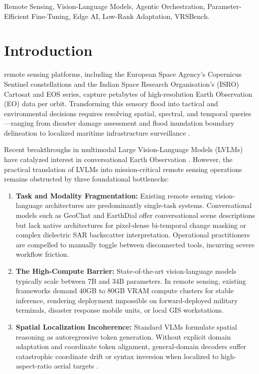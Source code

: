\documentclass[lettersize,journal]{IEEEtran}
\begin{document}
\begin{IEEEkeywords}
Remote Sensing, Vision-Language Models, Agentic Orchestration, Parameter-Efficient Fine-Tuning, Edge AI, Low-Rank Adaptation, VRSBench.
\end{IEEEkeywords}

\section{Introduction}
 remote sensing platforms, including the European Space Agency's Copernicus Sentinel constellations and the Indian Space Research Organisation's (ISRO) Cartosat and EOS series, capture petabytes of high-resolution Earth Observation (EO) data per orbit. Transforming this sensory flood into tactical and environmental decisions requires resolving spatial, spectral, and temporal queries---ranging from disaster damage assessment and flood inundation boundary delineation to localized maritime infrastructure surveillance \cite{xiang2024vrsbench, kuckreja2024geochat}.

Recent breakthroughs in multimodal Large Vision-Language Models (LVLMs) \cite{qwen2025qwen2vl, liu2023llava} have catalyzed interest in conversational Earth Observation \cite{soni2024earthdial, zhan2024skyeyegpt}. However, the practical translation of LVLMs into mission-critical remote sensing operations remains obstructed by three foundational bottlenecks:
\begin{enumerate}
    \item \textbf{Task and Modality Fragmentation:} Existing remote sensing vision-language architectures are predominantly single-task systems. Conversational models such as GeoChat \cite{kuckreja2024geochat} and EarthDial \cite{soni2024earthdial} offer conversational scene descriptions but lack native architectures for pixel-dense bi-temporal change masking or complex dielectric SAR backscatter interpretation. Operational practitioners are compelled to manually toggle between disconnected tools, incurring severe workflow friction.
    \item \textbf{The High-Compute Barrier:} State-of-the-art vision-language models typically scale between 7B and 34B parameters. In remote sensing, existing frameworks demand 40GB to 80GB VRAM compute clusters for stable inference, rendering deployment impossible on forward-deployed military terminals, disaster response mobile units, or local GIS workstations.
    \item \textbf{Spatial Localization Incoherence:} Standard VLMs formulate spatial reasoning as autoregressive token generation. Without explicit domain adaptation and coordinate token alignment, general-domain decoders suffer catastrophic coordinate drift or syntax inversion when localized to high-aspect-ratio aerial targets \cite{xiang2024vrsbench, liu2023groundingdino}.
\end{enumerate}
\end{document}
